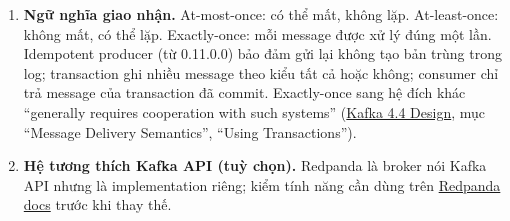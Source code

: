 \begin{enumerate}
  \item \textbf{Ngữ nghĩa giao nhận.} At-most-once: có thể mất, không lặp. At-least-once: không mất, có thể lặp. Exactly-once: mỗi message được xử lý đúng một lần. Idempotent producer (từ 0.11.0.0) bảo đảm gửi lại không tạo bản trùng trong log; transaction ghi nhiều message theo kiểu tất cả hoặc không; consumer  chỉ trả message của transaction đã commit. Exactly-once sang hệ đích khác ``generally requires cooperation with such systems'' (\href{https://kafka.apache.org/44/design/design/}{Kafka 4.4 Design}, mục ``Message Delivery Semantics'', ``Using Transactions'').
  \item \textbf{Hệ tương thích Kafka API (tuỳ chọn).} Redpanda là broker nói Kafka API nhưng là implementation riêng; kiểm tính năng cần dùng trên \href{https://docs.redpanda.com/}{Redpanda docs} trước khi thay thế.
\end{enumerate}

